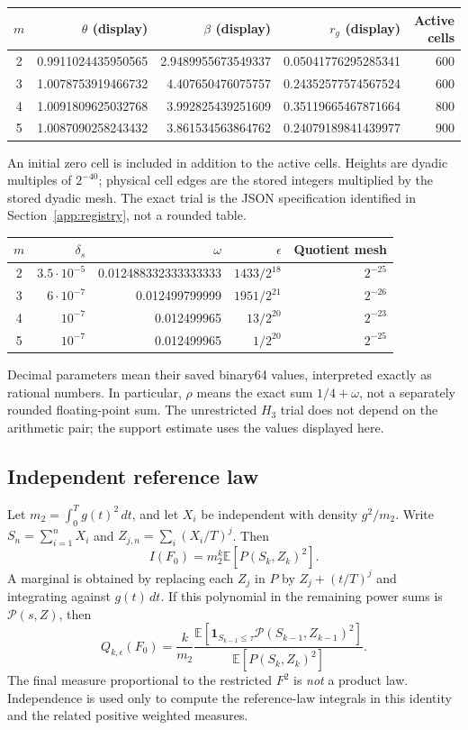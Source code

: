 \documentclass[11pt,a4paper]{article}
\theoremstyle{definition}\newtheorem{definition}[theorem]{Definition}
\theoremstyle{remark}\newtheorem{remark}[theorem]{Remark}
\newcommand{\E}{\mathbb E}\newcommand{\Prob}{\mathbb P}
\newcommand{\ind}{\mathbf 1}\newcommand{\dd}{\,d}
\newcommand{\smalltable}{\small\setlength{\tabcolsep}{5pt}}
\numberwithin{equation}{section}
\begin{document}
\begin{center}\smalltable
\begin{tabular}{@{}crrrr@{}}\toprule
$m$&$\theta$ (display)&$\beta$ (display)&$r_g$ (display)&Active cells\\\midrule
2&0.9911024435950565&2.9489955673549337&0.05041776295285341&600\\
3&1.0078753919466732&4.407650476075757&0.24352577574567524&600\\
4&1.0091809625032768&3.992825439251609&0.35119665467871664&800\\
5&1.0087090258243432&3.861534563864762&0.24079189841439977&900\\\bottomrule
\end{tabular}\end{center}
An initial zero cell is included in addition to the active cells. Heights are dyadic multiples of $2^{-40}$; physical cell edges are the stored integers multiplied by the stored dyadic mesh. The exact trial is the JSON specification identified in Section~\ref{app:registry}, not a rounded table.

\begin{center}\smalltable
\begin{tabular}{@{}crrrr@{}}\toprule
$m$&$\delta_s$&$\omega$&$\epsilon$&Quotient mesh\\\midrule
2&$3.5\cdot10^{-5}$&0.012488332333333333&$1433/2^{18}$&$2^{-25}$\\
3&$6\cdot10^{-7}$&0.012499799999&$1951/2^{21}$&$2^{-26}$\\
4&$10^{-7}$&0.012499965&$13/2^{20}$&$2^{-23}$\\
5&$10^{-7}$&0.012499965&$1/2^{20}$&$2^{-25}$\\\bottomrule
\end{tabular}\end{center}
Decimal parameters mean their saved binary64 values, interpreted exactly as rational numbers. In particular, $\rho$ means the exact sum $1/4+\omega$, not a separately rounded floating-point sum. The unrestricted $H_3$ trial does not depend on the arithmetic pair; the support estimate uses the values displayed here.

\subsection{Independent reference law}
Let $m_2=\int_0^Tg(t)^2\dd t$, and let $X_i$ be independent with density $g^2/m_2$. Write $S_n=\sum_{i=1}^nX_i$ and $Z_{j,n}=\sum_i(X_i/T)^j$. Then
\[
 I(F_0)=m_2^k\E[P(S_k,Z_k)^2].
\]
A marginal is obtained by replacing each $Z_j$ in $P$ by $Z_j+(t/T)^j$ and integrating against $g(t)\dd t$. If this polynomial in the remaining power sums is $\mathcal P(s,Z)$, then
\begin{equation}\label{eq:Qexpectation}
 Q_{k,\epsilon}(F_0)=\frac{k}{m_2}
 \frac{\E[\ind_{S_{k-1}\le\tau}\mathcal P(S_{k-1},Z_{k-1})^2]}
 {\E[P(S_k,Z_k)^2]}.
\end{equation}
The final measure proportional to the restricted $F^2$ is \emph{not} a product law. Independence is used only to compute the reference-law integrals in this identity and the related positive weighted measures.
\end{document}
